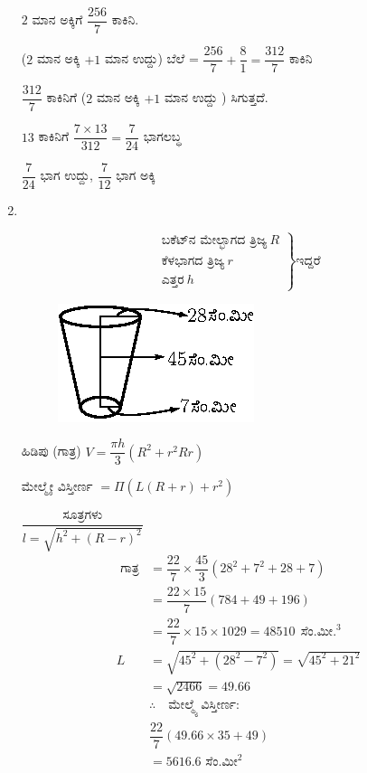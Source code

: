 \begin{enumerate}
\vskip 0.3cm

$2$ ಮಾನ ಅಕ್ಕಿಗೆ $\dfrac{256}{7}$ ಕಾಕಿನಿ. 

($2$ ಮಾನ ಅಕ್ಕಿ $+ 1$ ಮಾನ ಉದ್ದು) ಬೆಲೆ = $\dfrac{256}{7} + \dfrac{8}{1} = \dfrac{312}{7}$ ಕಾಕಿನಿ 

$\dfrac{312}{7}$ ಕಾಕಿನಿಗೆ ($2$ ಮಾನ ಅಕ್ಕಿ $+ 1$ ಮಾನ ಉದ್ದು ) ಸಿಗುತ್ತದೆ. 

$13$ ಕಾಕಿನಿಗೆ  $\dfrac{7\times 13}{312} = \dfrac{7}{24}$ ಭಾಗಲಬ್ಧ 

$\dfrac{7}{24}$ ಭಾಗ ಉದ್ದು, $\dfrac{7}{12}$ ಭಾಗ ಅಕ್ಕಿ 

\smallskip

\item 
~

\begin{minipage}[c]{4cm}
\begin{equation*}
\left.
\begin{aligned}
\text{ಬಕೆಟ್‌ನ ಮೇಲ್ಭಾಗದ ತ್ರಿಜ್ಯ}  ~R \\
\text{ಕೆಳಭಾಗದ ತ್ರಿಜ್ಯ} ~r   \\
\text{ಎತ್ತರ} ~h  
\end{aligned}
\right\}
\text{ಇದ್ದರೆ}
\end{equation*}
\end{minipage}
\qquad
\begin{minipage}[c]{5cm}
\begin{figure}[H]
\centering
\includegraphics{images/chap10/ans23.eps}
\end{figure}
\end{minipage}

\smallskip

ಹಿಡಿಪು (ಗಾತ್ರ) $V = \dfrac{\pi h}{3} (R^{2} + r^{2}  Rr)$

ಮೇಲ್ಮೈೕ  ವಿಸ್ತೀರ್ಣ $= \Pi (L(R + r) + r^{2})$

${\dfrac{{\text{ ಸೂತ್ರಗಳು }}}{l = \sqrt{h^{2} + (R - r)^{2}}}}$
\begin{align*}
\text{ ಗಾತ್ರ} & = \dfrac{22}{7} \times \dfrac{45}{3} (28^{2} + 7^{2} + 28 + 7)\\
& = \dfrac{22\times 15}{7} (784 + 49 + 196)\\
& = \dfrac{22}{7} \times 15\times 1029 = 48510 ~~\text{ಸೆಂ.ಮೀ.}^{3}\\
L & = \sqrt{45^{2} + (28^{2} - 7^{2})} = \sqrt{45^{2} + 21^{2}} \\
&= \sqrt{2466} = 49.66\\
& \therefore\quad \text{ಮೇಲ್ಮ್ಯೆ  ವಿಸ್ತೀರ್ಣ:}\\
& \dfrac{22}{7} (49.66\times 35 + 49) \\
& = 5616.6 \text{ ಸೆಂ.ಮೀ}^{2} 
\end{align*}


\end{enumerate}
